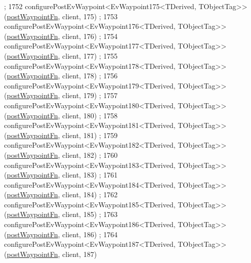 \begin{DoxyCode}
      ;
1752     configurePostEvWaypoint<EvWaypoint175<TDerived, TObjectTag>>(\hyperlink{classmove__base__z__client_1_1WaypointEventDispatcher_acc538eb7506c13f7cca2268a1742dadd}{postWaypointFn}, client, 175)
      ;
1753     configurePostEvWaypoint<EvWaypoint176<TDerived, TObjectTag>>(\hyperlink{classmove__base__z__client_1_1WaypointEventDispatcher_acc538eb7506c13f7cca2268a1742dadd}{postWaypointFn}, client, 176)
      ;
1754     configurePostEvWaypoint<EvWaypoint177<TDerived, TObjectTag>>(\hyperlink{classmove__base__z__client_1_1WaypointEventDispatcher_acc538eb7506c13f7cca2268a1742dadd}{postWaypointFn}, client, 177)
      ;
1755     configurePostEvWaypoint<EvWaypoint178<TDerived, TObjectTag>>(\hyperlink{classmove__base__z__client_1_1WaypointEventDispatcher_acc538eb7506c13f7cca2268a1742dadd}{postWaypointFn}, client, 178)
      ;
1756     configurePostEvWaypoint<EvWaypoint179<TDerived, TObjectTag>>(\hyperlink{classmove__base__z__client_1_1WaypointEventDispatcher_acc538eb7506c13f7cca2268a1742dadd}{postWaypointFn}, client, 179)
      ;
1757     configurePostEvWaypoint<EvWaypoint180<TDerived, TObjectTag>>(\hyperlink{classmove__base__z__client_1_1WaypointEventDispatcher_acc538eb7506c13f7cca2268a1742dadd}{postWaypointFn}, client, 180)
      ;
1758     configurePostEvWaypoint<EvWaypoint181<TDerived, TObjectTag>>(\hyperlink{classmove__base__z__client_1_1WaypointEventDispatcher_acc538eb7506c13f7cca2268a1742dadd}{postWaypointFn}, client, 181)
      ;
1759     configurePostEvWaypoint<EvWaypoint182<TDerived, TObjectTag>>(\hyperlink{classmove__base__z__client_1_1WaypointEventDispatcher_acc538eb7506c13f7cca2268a1742dadd}{postWaypointFn}, client, 182)
      ;
1760     configurePostEvWaypoint<EvWaypoint183<TDerived, TObjectTag>>(\hyperlink{classmove__base__z__client_1_1WaypointEventDispatcher_acc538eb7506c13f7cca2268a1742dadd}{postWaypointFn}, client, 183)
      ;
1761     configurePostEvWaypoint<EvWaypoint184<TDerived, TObjectTag>>(\hyperlink{classmove__base__z__client_1_1WaypointEventDispatcher_acc538eb7506c13f7cca2268a1742dadd}{postWaypointFn}, client, 184)
      ;
1762     configurePostEvWaypoint<EvWaypoint185<TDerived, TObjectTag>>(\hyperlink{classmove__base__z__client_1_1WaypointEventDispatcher_acc538eb7506c13f7cca2268a1742dadd}{postWaypointFn}, client, 185)
      ;
1763     configurePostEvWaypoint<EvWaypoint186<TDerived, TObjectTag>>(\hyperlink{classmove__base__z__client_1_1WaypointEventDispatcher_acc538eb7506c13f7cca2268a1742dadd}{postWaypointFn}, client, 186)
      ;
1764     configurePostEvWaypoint<EvWaypoint187<TDerived, TObjectTag>>(\hyperlink{classmove__base__z__client_1_1WaypointEventDispatcher_acc538eb7506c13f7cca2268a1742dadd}{postWaypointFn}, client, 187)

\end{DoxyCode}
